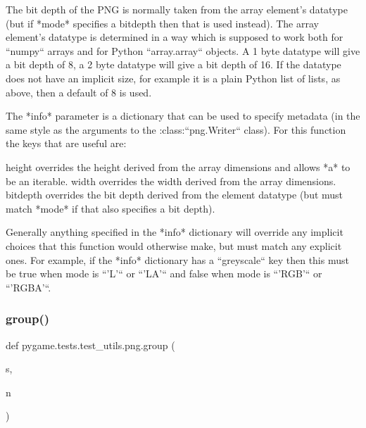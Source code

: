 \begin{DoxyVerb}
The bit depth of the PNG is normally taken from the array element's
datatype (but if *mode* specifies a bitdepth then that is used
instead).  The array element's datatype is determined in a way which
is supposed to work both for ``numpy`` arrays and for Python
``array.array`` objects.  A 1 byte datatype will give a bit depth of
8, a 2 byte datatype will give a bit depth of 16.  If the datatype
does not have an implicit size, for example it is a plain Python
list of lists, as above, then a default of 8 is used.

The *info* parameter is a dictionary that can be used to specify
metadata (in the same style as the arguments to the
:class:``png.Writer`` class).  For this function the keys that are
useful are:

height
  overrides the height derived from the array dimensions and allows
  *a* to be an iterable.
width
  overrides the width derived from the array dimensions.
bitdepth
  overrides the bit depth derived from the element datatype (but
  must match *mode* if that also specifies a bit depth).

Generally anything specified in the
*info* dictionary will override any implicit choices that this
function would otherwise make, but must match any explicit ones.
For example, if the *info* dictionary has a ``greyscale`` key then
this must be true when mode is ``'L'`` or ``'LA'`` and false when
mode is ``'RGB'`` or ``'RGBA'``.
\end{DoxyVerb}
 \mbox{\label{namespacepygame_1_1tests_1_1test__utils_1_1png_a2e2c0bbe3d6eefa01f7833d3f01041a3}} 
\subsubsection{\texorpdfstring{group()}{group()}}
{\footnotesize\ttfamily def pygame.\+tests.\+test\+\_\+utils.\+png.\+group (\begin{DoxyParamCaption}\item[{}]{s,  }\item[{}]{n }\end{DoxyParamCaption})}

\mbox{\label{namespacepygame_1_1tests_1_1test__utils_1_1png_ab4cb5af9ff32f19b67691f401d12b089}} 
